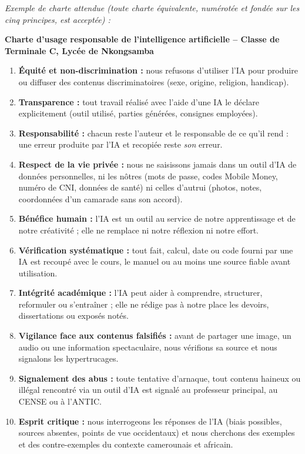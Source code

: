 \documentclass[11pt]{article}
\begin{document}
\begin{corrige}
\emph{Exemple de charte attendue (toute charte équivalente, numérotée et fondée sur les cinq principes, est acceptée) :}

\textbf{Charte d'usage responsable de l'intelligence artificielle -- Classe de Terminale C, Lycée de Nkongsamba}

\begin{enumerate}
\item \textbf{Équité et non-discrimination :} nous refusons d'utiliser l'IA pour produire ou diffuser des contenus discriminatoires (sexe, origine, religion, handicap).
\item \textbf{Transparence :} tout travail réalisé avec l'aide d'une IA le déclare explicitement (outil utilisé, parties générées, consignes employées).
\item \textbf{Responsabilité :} chacun reste l'auteur et le responsable de ce qu'il rend : une erreur produite par l'IA et recopiée reste \emph{son} erreur.
\item \textbf{Respect de la vie privée :} nous ne saisissons jamais dans un outil d'IA de données personnelles, ni les nôtres (mots de passe, codes Mobile Money, numéro de CNI, données de santé) ni celles d'autrui (photos, notes, coordonnées d'un camarade sans son accord).
\item \textbf{Bénéfice humain :} l'IA est un outil au service de notre apprentissage et de notre créativité ; elle ne remplace ni notre réflexion ni notre effort.
\item \textbf{Vérification systématique :} tout fait, calcul, date ou code fourni par une IA est recoupé avec le cours, le manuel ou au moins une source fiable avant utilisation.
\item \textbf{Intégrité académique :} l'IA peut aider à comprendre, structurer, reformuler ou s'entraîner ; elle ne rédige pas à notre place les devoirs, dissertations ou exposés notés.
\item \textbf{Vigilance face aux contenus falsifiés :} avant de partager une image, un audio ou une information spectaculaire, nous vérifions sa source et nous signalons les hypertrucages.
\item \textbf{Signalement des abus :} toute tentative d'arnaque, tout contenu haineux ou illégal rencontré via un outil d'IA est signalé au professeur principal, au CENSE ou à l'ANTIC.
\item \textbf{Esprit critique :} nous interrogeons les réponses de l'IA (biais possibles, sources absentes, points de vue occidentaux) et nous cherchons des exemples et des contre-exemples du contexte camerounais et africain.
\end{enumerate}


\end{corrige}
\end{document}
